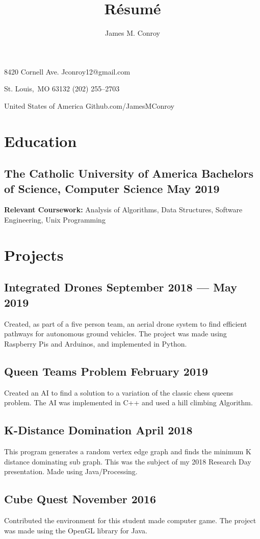 \documentclass[12pt]{article}
\author{James M. Conroy}
\title{R\'esum\'e}
\makeatletter
\renewcommand{\maketitle} {
	\begin{center}
	{\Large\bfseries
	\theauthor}

	\end{center}

	\setlength{\parindent}{0pt}
	\setlength{\parskip}{0em}
	8420 Cornell Ave.
	\hfill Jconroy12@gmail.com

	St. Louis,\ MO 63132
	\hfill (202) 255--2703

	United States of America
	\hfill Github.com/JamesMConroy
}
\makeatother
\begin{document}
\maketitle
\section{Education}
\subsection{The Catholic University of America \hspace {20pt} Bachelors of Science, Computer Science \hfill  May 2019 }

\noindent
\textbf{Relevant Coursework:}
Analysis of Algorithms,
Data Structures,
Software Engineering,
Unix Programming

\section{Projects}
\subsection{Integrated Drones \hfill September 2018 --- May 2019}
\justify
Created, as part of a five person team, an aerial drone system to find efficient pathways for autonomous ground vehicles.
The project was made using Raspberry Pis and Arduinos, and implemented in Python.

\subsection{Queen Teams Problem \hfill February 2019}
\justify
Created an AI to find a solution to a variation of the classic chess queens problem.
The AI was implemented in C++ and used a hill climbing Algorithm.

\subsection{K-Distance Domination \hfill April 2018}
\justify
This program generates a random vertex edge graph and finds the minimum K distance dominating sub graph.
This was the subject of my 2018 Research Day presentation.
Made using Java/Processing.

\subsection{Cube Quest \hfill November 2016}
\justify
Contributed the environment for this student made computer game.
The project was made using the OpenGL library for Java.
\end{document}
